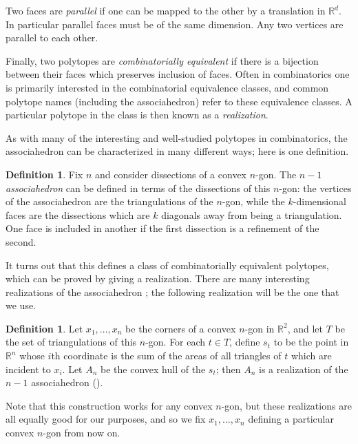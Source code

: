 \documentclass[11pt]{article}
\theoremstyle{remark}
\theoremstyle{definition}
\newtheorem{dfn}[thm]{Definition}
\begin{document}
Two faces are \emph{parallel} if one can be mapped to the other by a translation in $\mathbb{R}^d$.  In particular parallel faces must be of the same dimension. Any two vertices are parallel to each other.

Finally, two polytopes are \emph{combinatorially equivalent} if there is a bijection between their faces which preserves inclusion of faces.  Often in combinatorics one is primarily interested in the combinatorial equivalence classes, and common polytope names (including the associahedron) refer to these equivalence classes.  A particular polytope in the class is then known as a \emph{realization}.  

As with many of the interesting and well-studied polytopes in combinatorics, the associahedron can be characterized in many different ways; here is one definition.

\begin{dfn}\label{def:associahedron}
Fix $n$ and consider dissections of a convex $n$-gon.  The $n-1$ {\em associahedron} can be defined in terms of the dissections of this $n$-gon: the vertices of the associahedron are the triangulations of the $n$-gon, while the $k$-dimensional faces are the dissections which are $k$ diagonals away from being a triangulation.  One face is included in another if the first dissection is a refinement of the second. 
\end{dfn}

It turns out that this defines a class of combinatorially equivalent polytopes, which can be proved by giving a realization.  There are many interesting realizations of the associahedron \cite{CSZinequivalent}; the following realization will be the one that we use.  

\begin{dfn}\label{def:secondary polytope}
  Let $x_1, \ldots, x_n$ be the corners of a convex $n$-gon in $\mathbb{R}^2$, and let $T$ be the set of triangulations of this $n$-gon.  For each $t\in T$, define $s_t$ to be the point in $\mathbb{R}^n$ whose $i$th coordinate is the sum of the areas of all triangles of $t$ which are incident to $x_i$.  Let $A_n$ be the convex hull of the $s_t$; then $A_n$ is a realization of the $n-1$ associahedron (\cite[Example 9.11]{Ziegler}).
\end{dfn}
Note that this construction works for any convex $n$-gon, but these realizations are all equally good for our purposes, and so we fix $x_1, \ldots, x_n$ defining a particular convex $n$-gon from now on.
\end{document}
